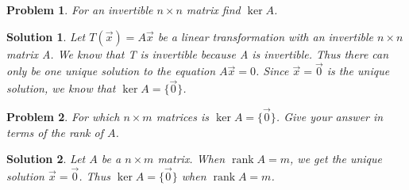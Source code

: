 \documentclass{article}
\newtheorem{problem}{Problem}
\newtheorem*{solution}{Solution}
\DeclareMathOperator{\Rank}{rank}
\begin{document}
\begin{problem}
For an invertible $n \times n$ matrix find $\ker A$.
\end{problem}

\begin{solution}
Let $T(\vec{x}) = A\vec{x}$ be a linear transformation with an invertible $n \times n$ matrix A. We know that T is invertible because A is invertible. Thus there can only be one unique solution to the equation $A\vec{x} = 0$. Since $\vec{x} = \vec{0}$ is the unique solution, we know that $\ker A = \{\vec{0}\}$.
\end{solution}

\begin{problem}
For which $n \times m$ matrices is $\ker A = \{\vec{0}\}$. Give your answer in terms of the rank of $A$.
\end{problem}

\begin{solution}
Let $A$ be a $n \times m$ matrix. When $\Rank A = m$, we get the unique solution $\vec{x} = \vec{0}$. Thus $\ker A = \{ \vec{0} \}$ when $\Rank A = m$.
\end{solution}
\end{document}
